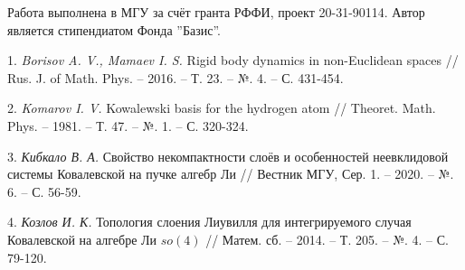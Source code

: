 \begin{figure}[h]
	\label{bif_diagr}
\end{figure}


Работа выполнена в МГУ за счёт гранта РФФИ, проект 20-31-90114. Автор является стипендиатом Фонда ''Базис''.

\litlist

1. {\it Borisov A. V., Mamaev I. S.} Rigid body dynamics in non-Euclidean spaces // Rus. J. of
Math. Phys. – 2016. – Т. 23. – №. 4. – С. 431-454.

2. {\it Komarov I. V.} Kowalewski basis for the hydrogen atom
 // Theoret. Math. Phys. – 1981. – Т. 47. – №. 1. – С. 320-324.

3. {\it Кибкало В. А.} Свойство некомпактности слоёв и особенностей неевклидовой системы Ковалевской на пучке алгебр Ли // Вестник МГУ, Сер. 1. – 2020. – №. 6. – С. 56-59.

4. {\it Козлов И. К.} Топология слоения Лиувилля для интегрируемого случая Ковалевской на алгебре Ли $so(4)$
 // Матем. сб. – 2014. – Т. 205. – №. 4. – С. 79-120.

